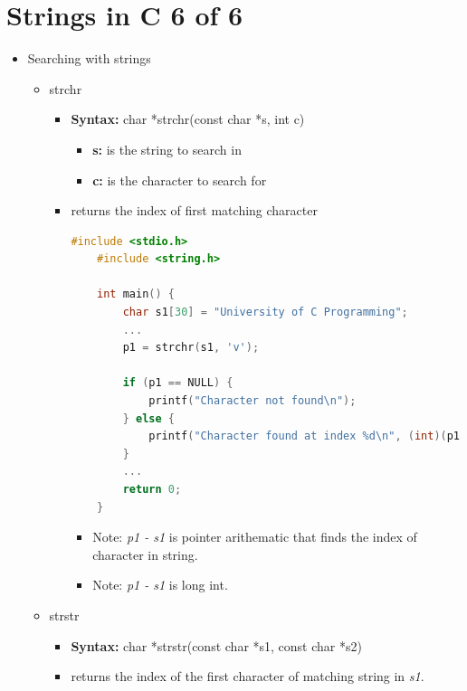\documentclass[12pt]{article}
\begin{document}
\bigskip

\section*{Strings in C 6 of 6}

\bigskip

\begin{itemize}
    \item Searching with strings
    \begin{itemize}
        \item strchr
        \begin{itemize}
            \item \textbf{Syntax:} char *strchr(const char *s, int c)
            \begin{itemize}
                \item \textbf{s:} is the string to search in
                \item \textbf{c:} is the character to search for
            \end{itemize}
            \item returns the index of first matching character
    \begin{lstlisting}[language=c,caption={strings\_example\_6.c}]
    #include <stdio.h>
    #include <string.h>

    int main() {
        char s1[30] = "University of C Programming";
        ...
        p1 = strchr(s1, 'v');

        if (p1 == NULL) {
            printf("Character not found\n");
        } else {
            printf("Character found at index %d\n", (int)(p1 - s1)); // <- returns index 3
        }
        ...
        return 0;
    }
    \end{lstlisting}

        \bigskip

        \begin{itemize}
            \item Note: \textit{p1 - s1} is pointer arithematic that finds the index
            of character in string.
            \item Note: \textit{p1 - s1} is long int.
        \end{itemize}
        \end{itemize}

        \item strstr

        \begin{itemize}
            \item \textbf{Syntax:} char *strstr(const char *s1, const char *s2)
            \item returns the index of the first character of matching string in \textit{s1}.
        \end{itemize}


\end{itemize}
\end{itemize}
\end{document}
